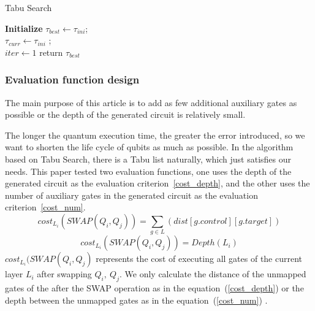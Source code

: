 \documentclass[runningheads]{llncs}
\begin{document}
			\begin{algorithm} 
			\label{algorithm_Tabu}
				\caption{Tabu Search }  
				\LinesNumbered  
				\textbf{Initialize}
					$\tau_{best}  \leftarrow \tau_{ini}$; \\
					$\tau_{curr} \leftarrow \tau_{ini}$ ;\\
					$iter \leftarrow 1$  
				return $\tau_{best}$
				\end{algorithm}
\subsubsection{Evaluation function design }
The main purpose of this article is to 
add as few additional auxiliary gates as possible or 
the depth of the generated circuit is relatively small.

The longer the quantum execution time, the greater the error introduced, 
so we want to shorten the life cycle of qubits as much as possible. 
In the algorithm based on Tabu Search, there is a Tabu list naturally, 
which just satisfies our needs.
This paper tested two evaluation functions, 
one uses the depth of the generated circuit as the evaluation criterion~\ref{cost_depth}, 
and the other uses the number of auxiliary gates in the generated circuit as the evaluation criterion~\ref{cost_num}.
\begin{equation}
	cost_{L_{i}}(SWAP(Q_{i},Q_{j}))= \sum_{g \in L}(dist[g.control][g.target])
	\label{cost_num}
	\end{equation}
	\begin{equation}
		cost_{L_{i}}(SWAP(Q_{i},Q_{j}))= Depth(L_{i})
		\label{cost_depth}
		\end{equation}
$cost_{L_i}(SWAP(Q_{i},Q_{j})$ represents the cost of executing all gates of the current layer $L_i$ 
after swapping $Q_{i}, \ Q_{j}$.
We only calculate the distance of the unmapped gates of the after the SWAP operation as in the equation~(\ref{cost_depth})
 or the depth between the unmapped gates as in the equation~(\ref{cost_num}) .
\end{document}
